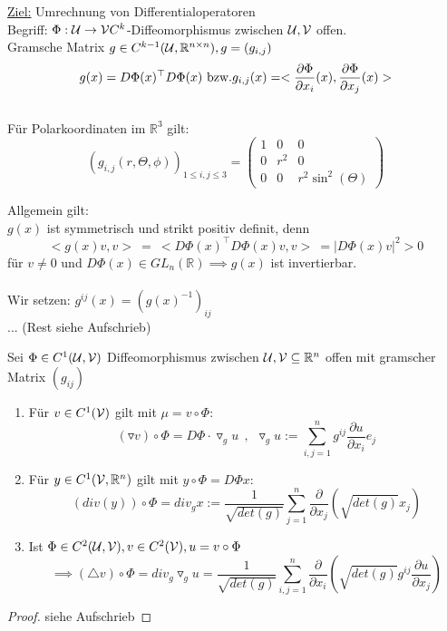   \begin{remark}
    \underline{Ziel:} Umrechnung von Differentialoperatoren\\
    Begriff: $\Phi: \mathcal{U} \to \mathcal{V} C^k$-Diffeomorphismus zwischen $\mathcal{U}, \mathcal{V}$ offen.\\
    Gramsche Matrix $g \in C^{k-1}(\mathcal{U}, \mathbb{R}^{n\times n}), g = (g_{i,j})$
    $$g(x) = D\Phi(x)^{\top} D\Phi(x) \text{ bzw.}\\
    g_{i,j}(x) = <\frac{\partial\Phi}{\partial x_i}(x), \frac{\partial\Phi}{\partial x_j}(x)>$$\\
    Für Polarkoordinaten im $\mathbb{R}^3$ gilt:
    $$(g_{i,j}(r, \Theta, \phi))_{1\leq i,j \leq 3} = \left(\begin{array}{ccc}
      1 & 0 & 0 \\
      0 & r^2 & 0 \\
      0 & 0 & r^2 \sin^2(\Theta)      
    \end{array}\right)$$
    
    \newpage

    Allgemein gilt:\\
    $g(x)$ ist symmetrisch und strikt positiv definit, denn
    $$<g(x)v,v> \ = \ <D\Phi(x)^{\top}D\Phi(x) v, v> \ = |D\Phi(x) v|^2 > 0$$
    für $v\neq 0$ und $D\Phi(x) \in GL_n(\mathbb{R}) \implies g(x)$ ist invertierbar.\\
    \\
    Wir setzen: $g^{ij}(x) = (g(x)^{-1})_{ij}$\\
    ... (Rest siehe Aufschrieb)
  \end{remark}

  \begin{theorem}
    Sei $\Phi \in C^1(\mathcal{U}, \mathcal{V})$ Diffeomorphismus zwischen $\mathcal{U}, \mathcal{V} \subseteq \mathbb{R}^n$ offen mit gramscher Matrix $(g_{ij})$
    \begin{enumerate}
      \item Für $v \in C^1(\mathcal{V})$ gilt mit $\mu = v \circ \Phi$:
      $$(\triangledown v) \circ \Phi = D\Phi \cdot \triangledown_g u \ \ , \ \ \triangledown_g u := \sum\limits_{i,j=1}^n g^{ij} \frac{\partial u}{\partial x_i} e_j$$
      \item Für $y \in C^1(\mathcal{V}, \mathbb{R}^n)$ gilt mit $y \circ \Phi = D\Phi x$:
        $$(div(y)) \circ \Phi = div_g x := \frac{1}{\sqrt{det(g)}} \sum\limits_{j=1}^n \frac{\partial}{\partial x_j} (\sqrt{det(g)} x_j)$$
      \item Ist $\Phi \in C^2(\mathcal{U}, \mathcal{V}), v \in C^2(\mathcal{V}), u = v \circ \Phi$
        $$\implies (\triangle v) \circ \Phi = div_g \triangledown_g u = \frac{1}{\sqrt{det(g)}} \sum\limits_{i,j=1}^n \frac{\partial}{\partial x_i} (\sqrt{det(g)} g^{ij} \frac{\partial u}{\partial x_j})$$
    \end{enumerate}
  \end{theorem}
  \begin{proof}
    siehe Aufschrieb
  \end{proof}

